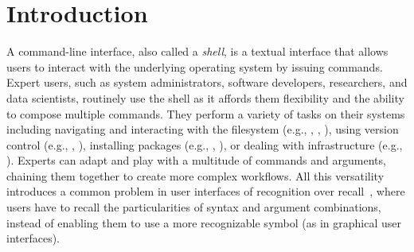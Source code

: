 \section{Introduction}

A command-line interface, also called a \emph{shell}, is a textual interface that allows users to interact with the underlying operating system by issuing commands.
Expert users, such as system administrators, software developers, researchers, and data scientists, routinely use the shell as it affords them flexibility and the ability to compose multiple commands.
They perform a variety of tasks on their systems including navigating and interacting with the filesystem (e.g., , , ), using version control (e.g., , ), installing packages (e.g., , ), or dealing with infrastructure (e.g., ).
Experts can adapt and play with a multitude of commands and arguments, chaining them together to create more complex workflows.
All this versatility introduces a common problem in user interfaces of recognition over recall~\citep{nielsen:05}, where users have to recall the particularities of syntax and argument combinations, instead of enabling them to use a more recognizable symbol (as in graphical user interfaces).

